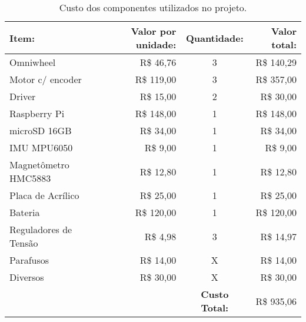 \begin{table}
  \caption{Custo dos componentes utilizados no projeto.}
  \begin{tabular}{||l r c r||}
     \hline
     \textbf{Item:}   & \textbf{Valor por unidade:} & \textbf{Quantidade:} & \textbf{Valor total:} \\ \hline\hline
     Omniwheel        & R\$ 46,76                   &  3                   & R\$ 140,29            \\ \hline
     Motor c/ encoder & R\$ 119,00                  &  3                   & R\$ 357,00            \\ \hline
     Driver           & R\$ 15,00                   &  2                   & R\$ 30,00             \\ \hline
     Raspberry Pi     & R\$ 148,00                  &  1                   & R\$ 148,00            \\ \hline
     microSD 16GB     & R\$ 34,00                   &  1                   & R\$ 34,00             \\ \hline
     IMU MPU6050      & R\$ 9,00                    &  1                   & R\$ 9,00              \\ \hline
     Magnetômetro HMC5883 & R\$ 12,80               &  1                   & R\$ 12,80             \\ \hline
    Placa de Acrílico & R\$ 25,00                   &  1                   & R\$ 25,00             \\ \hline
     Bateria          & R\$ 120,00                  &  1                   & R\$ 120,00            \\ \hline
     Reguladores de Tensão & R\$ 4,98               &  3                   & R\$ 14,97             \\ \hline
     Parafusos        & R\$ 14,00                   &  X                   & R\$ 14,00             \\ \hline
     Diversos         & R\$ 30,00                   &  X                   & R\$ 30,00             \\ \hline\hline
                      &                             & \textbf{Custo Total:} & R\$ 935,06           \\ \hline
  \end{tabular}
  \label{tab:custo}
\end{table}
